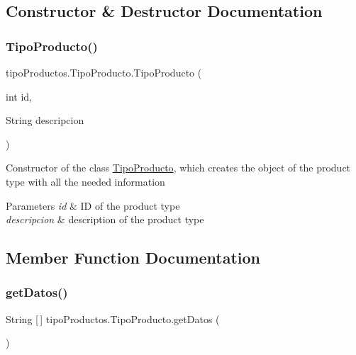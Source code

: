\subsection{Constructor \& Destructor Documentation}
\mbox{\label{classtipo_productos_1_1_tipo_producto_abc3130af94301f568e71a09729690060}} 
\subsubsection{\texorpdfstring{Tipo\+Producto()}{TipoProducto()}}
{\footnotesize\ttfamily tipo\+Productos.\+Tipo\+Producto.\+Tipo\+Producto (\begin{DoxyParamCaption}\item[{int}]{id,  }\item[{String}]{descripcion }\end{DoxyParamCaption})\hspace{0.3cm}{\ttfamily [inline]}}

Constructor of the class \mbox{\hyperlink{classtipo_productos_1_1_tipo_producto}{Tipo\+Producto}}, which creates the object of the product type with all the needed information 
\begin{DoxyParams}{Parameters}
{\em id} & ID of the product type \\
\hline
{\em descripcion} & description of the product type \\
\hline
\end{DoxyParams}


\subsection{Member Function Documentation}
\mbox{\label{classtipo_productos_1_1_tipo_producto_a85837c84193d02f0ed6b43809c09e13e}} 
\subsubsection{\texorpdfstring{get\+Datos()}{getDatos()}}
{\footnotesize\ttfamily String \mbox{[}$\,$\mbox{]} tipo\+Productos.\+Tipo\+Producto.\+get\+Datos (\begin{DoxyParamCaption}{ }\end{DoxyParamCaption})\hspace{0.3cm}{\ttfamily [inline]}}

